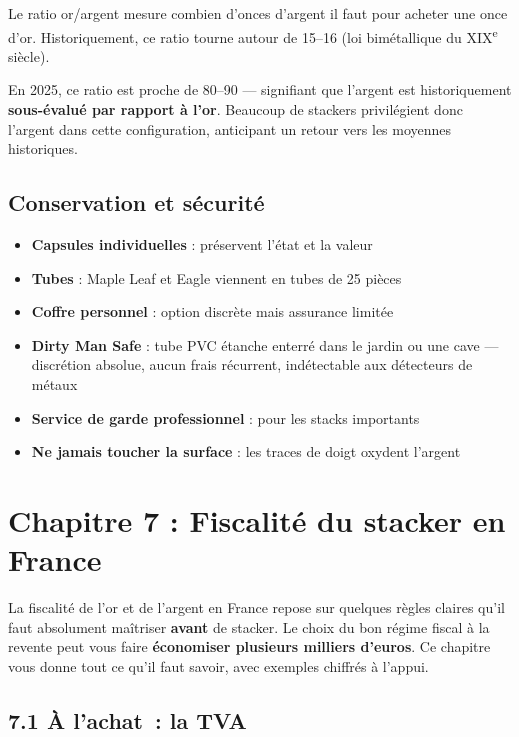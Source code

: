 \documentclass[14pt,a4paper]{extarticle}
\begin{document}
Le ratio or/argent mesure combien d'onces d'argent il faut pour acheter une once d'or. Historiquement, ce ratio tourne autour de 15--16 (loi bimétallique du XIX\textsuperscript{e} siècle).

En 2025, ce ratio est proche de 80--90 --- signifiant que l'argent est historiquement \textbf{sous-évalué par rapport à l'or}. Beaucoup de stackers privilégient donc l'argent dans cette configuration, anticipant un retour vers les moyennes historiques.

\subsection{Conservation et sécurité}

\begin{itemize}
  \item \textbf{Capsules individuelles} : préservent l'état et la valeur
  \item \textbf{Tubes} : Maple Leaf et Eagle viennent en tubes de 25 pièces
  \item \textbf{Coffre personnel} : option discrète mais assurance limitée
  \item \textbf{Dirty Man Safe} : tube PVC étanche enterré dans le jardin ou une cave --- discrétion absolue, aucun frais récurrent, indétectable aux détecteurs de métaux
  \item \textbf{Service de garde professionnel} : pour les stacks importants
  \item \textbf{Ne jamais toucher la surface} : les traces de doigt oxydent l'argent
\end{itemize}

\newpage

\section{Chapitre 7 : Fiscalité du stacker en France}

La fiscalité de l'or et de l'argent en France repose sur quelques règles claires qu'il faut absolument maîtriser \textbf{avant} de stacker. Le choix du bon régime fiscal à la revente peut vous faire \textbf{économiser plusieurs milliers d'euros}. Ce chapitre vous donne tout ce qu'il faut savoir, avec exemples chiffrés à l'appui.

\subsection{7.1 À l'achat~: la TVA}
\end{document}
